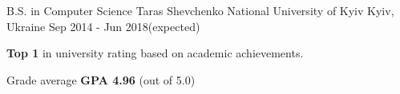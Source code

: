 

\begin{cventries}

  \cventry
    {B.S. in Computer Science} %
    {Taras Shevchenko National University of Kyiv} %
    {Kyiv, Ukraine} %
    {Sep 2014 - Jun 2018(expected)} %
    {
      \begin{cvitems} %
        \item {\textbf{Top 1} in university rating based on academic achievements.}
        \item {Grade average \textbf{GPA 4.96} (out of 5.0)}
      \end{cvitems}
    }
\end{cventries}
